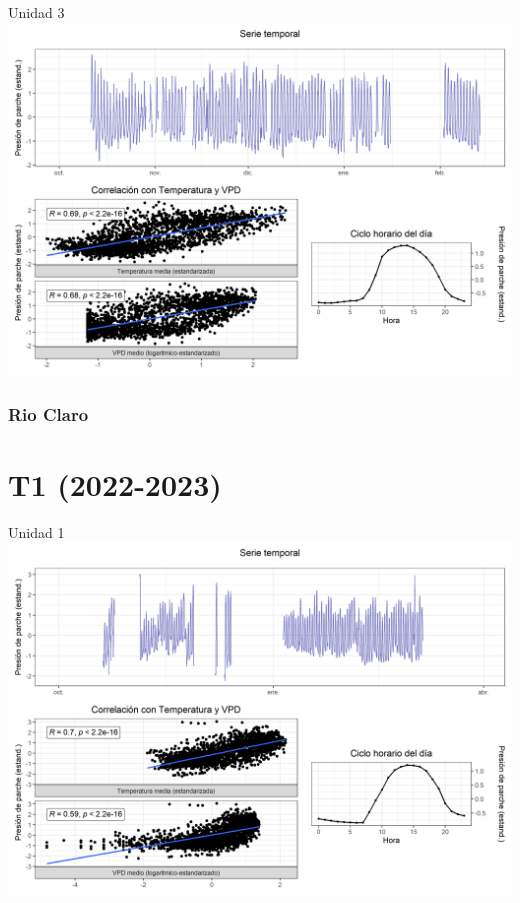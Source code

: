 \documentclass[
  letterpaper,
  DIV=11,
  numbers=noendperiod]{scrreprt}
\begin{document}
Unidad 3
\includegraphics{figuras/04_turgor_unidad/2023_2024_La_Esperanza_T4_Unidad_3.png}

\subsection{Rio Claro}\label{rio-claro-4}

\chapter{T1 (2022-2023)}

Unidad 1
\includegraphics{figuras/04_turgor_unidad/2022_2023_Rio_Claro_T1_Unidad_1.png}
\end{document}
